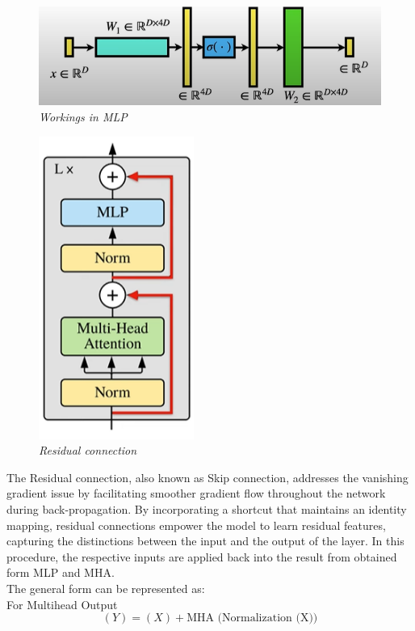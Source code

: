 \begin{figure}[htbp]
    \centering
    \includegraphics[width=5.5in]{img/MLP workings.png}
    \caption{\textit{Workings in MLP}}
\end{figure}
\newpage
\begin{figure}[htbp]
    \centering
    \includegraphics[width=2in]{img/residual connection.png}
    \caption{\textit{Residual connection}}
\end{figure}
The Residual connection, also known as Skip connection, addresses the vanishing gradient issue by facilitating smoother gradient flow throughout the network during back-propagation. By incorporating a shortcut that maintains an identity mapping, residual connections empower the model to learn residual features, capturing the distinctions between the input and the output of the layer. In this procedure, the respective inputs are applied back into the result from obtained form MLP and MHA.\\

The general form can be represented as:\\

For Multihead Output\\
\[(Y) = (X)+\text{MHA (Normalization (X))}\]

